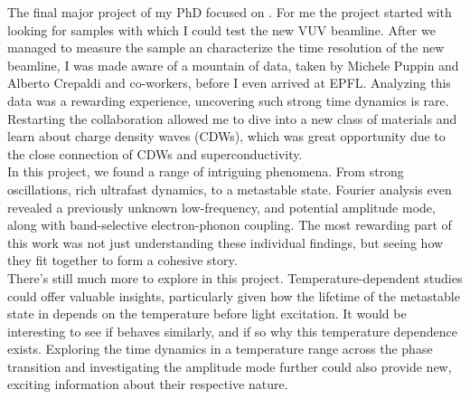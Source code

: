The final major project of my PhD focused on .
For me the project started with looking for samples with which I could test the new VUV beamline.
After we managed to measure the sample an characterize the time resolution of the new beamline, I was made aware of a mountain of data, taken by Michele Puppin and Alberto Crepaldi and co-workers, before I even arrived at EPFL.
Analyzing this data was a rewarding experience, uncovering such strong time dynamics is rare.
Restarting the collaboration allowed me to dive into a new class of materials and learn about charge density waves (CDWs), which was great opportunity due to the close connection of CDWs and superconductivity.\\
In this project, we found a range of intriguing phenomena.
From strong oscillations, rich ultrafast dynamics, to a metastable state.
Fourier analysis even revealed a previously unknown low-frequency, and potential amplitude mode, along with band-selective electron-phonon coupling.
The most rewarding part of this work was not just understanding these individual findings, but seeing how they fit together to form a cohesive story.\\
There’s still much more to explore in this project.
Temperature-dependent studies could offer valuable insights, particularly given how the lifetime of the metastable state in  depends on the temperature before light excitation.
It would be interesting to see if  behaves similarly, and if so why this temperature dependence exists.
Exploring the time dynamics in a temperature range across the phase transition and investigating the amplitude mode further could also provide new, exciting information about their respective nature.\hfill\break

